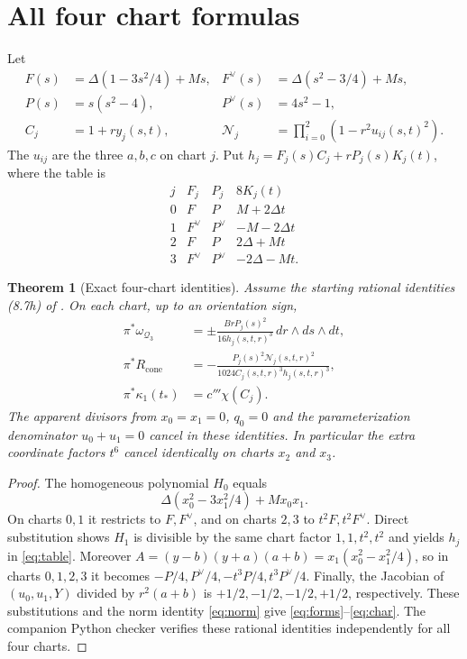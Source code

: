 \documentclass[12pt,letterpaper]{amsart}
\newtheorem{theorem}{Theorem}[section]
\begin{document}
\section{All four chart formulas}
Let
\begin{align*}
 F(s)&=\Delta(1-3s^2/4)+Ms,&F^\vee(s)&=\Delta(s^2-3/4)+Ms,\\
 P(s)&=s(s^2-4),&P^\vee(s)&=4s^2-1,\\
 C_j&=1+ry_j(s,t),&\mathcal N_j&=\prod_{i=0}^2(1-r^2u_{ij}(s,t)^2).
\end{align*}
The $u_{ij}$ are the three $a,b,c$ on chart $j$. Put $h_j=F_j(s)C_j+rP_j(s)K_j(t)$, where the table is
\begin{equation}\label{eq:table}
\begin{array}{c|c|c|c}
 j&F_j&P_j&8K_j(t)\\\hline
0&F&P&M+2\Delta t\\
1&F^\vee&P^\vee&-M-2\Delta t\\
2&F&P&2\Delta+Mt\\
3&F^\vee&P^\vee&-2\Delta-Mt.
\end{array}
\end{equation}
\begin{theorem}[Exact four-chart identities]\label{thm:four}
Assume the starting rational identities (8.7h) of \cite{Jo26}. On each chart, up to an orientation sign,
\begin{align}\label{eq:forms}
\pi^*\omega_{\mathcal Q_3}
 &=\pm\frac{B rP_j(s)^2}{16h_j(s,t,r)^3}\,dr\wedge ds\wedge dt,\\
\pi^*R_{\mathrm{cone}}
 &=-\frac{P_j(s)^2\mathcal N_j(s,t,r)^2}{1024 C_j(s,t,r)^3h_j(s,t,r)^3},\label{eq:reg}\\
\pi^*\kappa_1(t_*)&=c'''\chi(C_j).\label{eq:char}
\end{align}
The apparent divisors from $x_0=x_1=0$, $q_0=0$ and the parameterization denominator $u_0+u_1=0$ cancel in these identities. In particular the extra coordinate factors $t^6$ cancel identically on charts $x_2$ and $x_3$.
\end{theorem}
\begin{proof}
The homogeneous polynomial $H_0$ equals
\[
 \Delta(x_0^2-3x_1^2/4)+M x_0x_1.
\]
On charts $0,1$ it restricts to $F,F^\vee$, and on charts $2,3$ to $t^2F,t^2F^\vee$. Direct substitution shows $H_1$ is divisible by the same chart factor $1,1,t^2,t^2$ and yields $h_j$ in \eqref{eq:table}. Moreover $A=(y-b)(y+a)(a+b)=x_1(x_0^2-x_1^2/4)$, so in charts $0,1,2,3$ it becomes $-P/4,P^\vee/4,-t^3P/4,t^3P^\vee/4$. Finally, the Jacobian of $(u_0,u_1,Y)$ divided by $r^2(a+b)$ is $+1/2,-1/2,-1/2,+1/2$, respectively. These substitutions and the norm identity \eqref{eq:norm} give \eqref{eq:forms}--\eqref{eq:char}. The companion Python checker verifies these rational identities independently for all four charts.
\end{proof}
\end{document}
